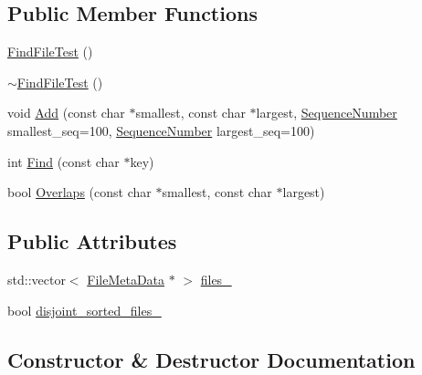 \subsection*{Public Member Functions}
\begin{DoxyCompactItemize}
\item 
\mbox{\hyperlink{classleveldb_1_1_find_file_test_a79d3a7171588c32598d46610563709e8}{Find\+File\+Test}} ()
\item 
\mbox{\hyperlink{classleveldb_1_1_find_file_test_a147a326f046217d4a6cf737d3346bde7}{$\sim$\+Find\+File\+Test}} ()
\item 
void \mbox{\hyperlink{classleveldb_1_1_find_file_test_a7daf932b5d9881438c6edb5f7881901c}{Add}} (const char $\ast$smallest, const char $\ast$largest, \mbox{\hyperlink{namespaceleveldb_a5481ededd221c36d652c371249f869fa}{Sequence\+Number}} smallest\+\_\+seq=100, \mbox{\hyperlink{namespaceleveldb_a5481ededd221c36d652c371249f869fa}{Sequence\+Number}} largest\+\_\+seq=100)
\item 
int \mbox{\hyperlink{classleveldb_1_1_find_file_test_a233fd8c1e1764f2572e03d28b1f58ae0}{Find}} (const char $\ast$key)
\item 
bool \mbox{\hyperlink{classleveldb_1_1_find_file_test_a617e51dc2e6acbe7d5bc6d0a7224ac51}{Overlaps}} (const char $\ast$smallest, const char $\ast$largest)
\end{DoxyCompactItemize}
\subsection*{Public Attributes}
\begin{DoxyCompactItemize}
\item 
std\+::vector$<$ \mbox{\hyperlink{structleveldb_1_1_file_meta_data}{File\+Meta\+Data}} $\ast$ $>$ \mbox{\hyperlink{classleveldb_1_1_find_file_test_a53b61e6b01283c235fae219013b0e2c7}{files\+\_\+}}
\item 
bool \mbox{\hyperlink{classleveldb_1_1_find_file_test_acf50512be17b9a3cd96388a8c837b8e0}{disjoint\+\_\+sorted\+\_\+files\+\_\+}}
\end{DoxyCompactItemize}


\subsection{Constructor \& Destructor Documentation}
\mbox{\label{classleveldb_1_1_find_file_test_a79d3a7171588c32598d46610563709e8}} 
